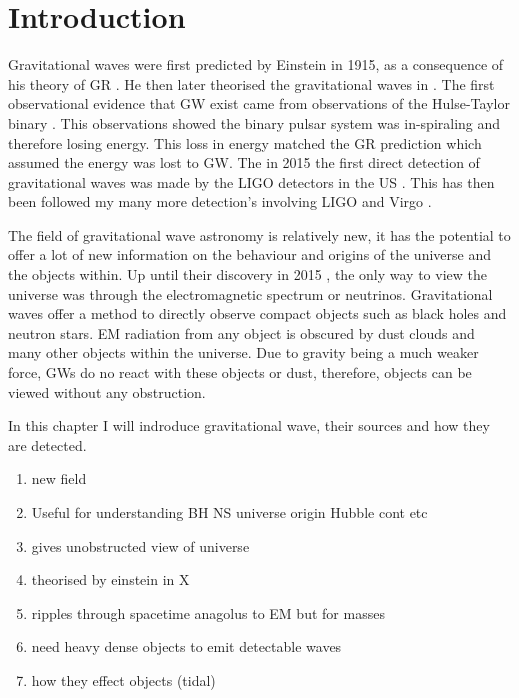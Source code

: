 \chapter{Introduction}

Gravitational waves were first predicted by Einstein in 1915, as a consequence of his theory of \ac{GR} \cite{}. He then later theorised the gravitational waves in \cite{}.
The first observational evidence that \ac{GW} exist came from observations of the Hulse-Taylor binary \cite{}. 
This observations showed the binary pulsar system was in-spiraling and therefore losing energy.
This loss in energy matched the \ac{GR} prediction which assumed the energy was lost to \ac{GW}.
The in 2015 the first direct detection of gravitational waves was made by the \ac{LIGO} detectors in the US \cite{}.
This has then been followed my many more detection's involving \ac{LIGO} and Virgo \cite{}.

The field of gravitational wave astronomy is relatively new, it has the potential to offer a lot of new information on the behaviour and origins of the universe and the objects within. 
Up until their discovery in 2015 \cite{}, the only way to view the universe was through the electromagnetic spectrum or neutrinos. 
Gravitational waves offer a method to directly observe compact objects such as black holes and neutron stars. 
\ac{EM} radiation from any object is obscured by dust clouds and many other objects within the universe.
Due to gravity being a much weaker force, \acp{GW} do no react with these objects or dust, therefore, objects can be viewed without any obstruction. 

In this chapter I will indroduce gravitational wave, their sources and how they are detected. 



\begin{enumerate} 
    \item new field
    \item Useful for understanding BH NS universe origin Hubble cont etc
    \item gives unobstructed view of universe
    \item theorised by einstein in X
    \item ripples through spacetime anagolus to EM but for masses 
    \item need heavy dense objects to emit detectable waves
    \item how they effect objects (tidal)
    
\end{enumerate}

